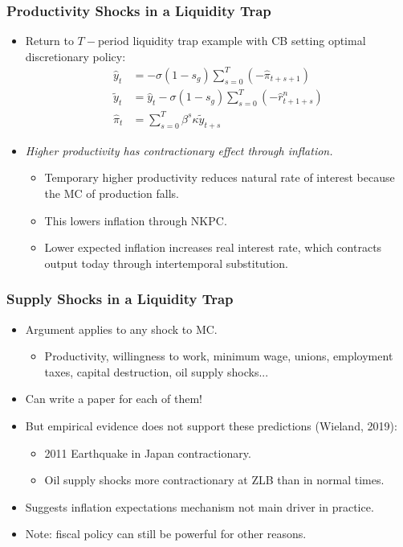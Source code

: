 \documentclass[english,xcolor=svgnames]{beamer}
\begin{document}
\begin{frame}
\frametitle{Productivity Shocks in a Liquidity Trap}
\begin{itemize}
	\item Return to $T-$period liquidity trap example with CB setting optimal discretionary policy:
	\begin{align*}
		\hat{y}_t &= -\sigma(1-s_g) \sum_{s=0}^{T}(-\hat{\pi}_{t+s+1}) \\
		\tilde{y}_t &= \hat{y}_t -\sigma(1-s_g) \sum_{s=0}^{T}(-\hat{r}_{t+1+s}^n) \\
		\hat{\pi}_t&=\sum_{s=0}^{T}\beta^s \kappa \tilde{y}_{t+s}
	\end{align*}
	\item \emph{Higher productivity has contractionary effect through inflation.}
	\begin{itemize}
		\item Temporary higher productivity reduces natural rate of interest because the MC of production falls.
		\item This lowers inflation through NKPC.
		\item Lower expected inflation increases real interest rate, which contracts output today through intertemporal substitution.
	\end{itemize}
\end{itemize}
\end{frame}

\begin{frame}
\frametitle{Supply Shocks in a Liquidity Trap}
\begin{itemize}
	\item Argument applies to any shock to MC.
	\begin{itemize}
		\item Productivity, willingness to work, minimum wage, unions, employment taxes, capital destruction, oil supply shocks...
	\end{itemize}
	\item Can write a paper for each of them!
	\item But empirical evidence does not support these predictions (Wieland, 2019):
	\begin{itemize}
		\item 2011 Earthquake in Japan contractionary.
		\item Oil supply shocks more contractionary at ZLB than in normal times.
	\end{itemize}
	\item Suggests inflation expectations mechanism not main driver in practice.
	\item Note: fiscal policy can still be powerful for other reasons.
\end{itemize}
\end{frame}
\end{document}
